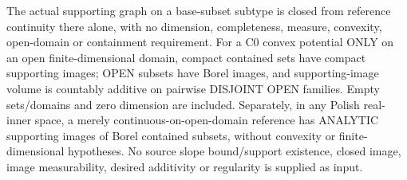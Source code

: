 \begin{lemma}
  \label{lem:domain-support-images}
  \leanok
  The actual supporting graph on a base-subset subtype is closed from reference
  continuity there alone, with no dimension, completeness, measure, convexity,
  open-domain or containment requirement. For a C0 convex potential ONLY on an
  open finite-dimensional domain, compact contained sets have compact supporting
  images; OPEN subsets have Borel images, and supporting-image volume is
  countably additive on pairwise DISJOINT OPEN families. Empty sets/domains and
  zero dimension are included. Separately, in any Polish real-inner space, a
  merely continuous-on-open-domain reference has ANALYTIC supporting images of
  Borel contained subsets, without convexity or finite-dimensional hypotheses.
  No source slope bound/support existence, closed image, image measurability,
  desired additivity or regularity is supplied as input.
\end{lemma}
